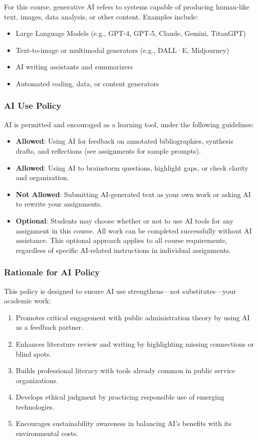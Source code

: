 \documentclass[12pt, letterpaper]{article}
\begin{document}
\noindent For this course, generative AI refers to systems capable of producing human-like text, images, data analysis, or other content. Examples include:

\begin{itemize}
    \item Large Language Models (e.g., GPT-4, GPT-5, Claude, Gemini, TitanGPT)
    \item Text-to-image or multimodal generators (e.g., DALL·E, Midjourney)
    \item AI writing assistants and summarizers
    \item Automated coding, data, or content generators
\end{itemize}

\subsubsection*{AI Use Policy}

AI is permitted and encouraged as a learning tool, under the following guidelines:

\begin{itemize}
    \item \textbf{Allowed}: Using AI for feedback on annotated bibliographies, synthesis drafts, and reflections (see assignments for sample prompts).
    \item \textbf{Allowed}: Using AI to brainstorm questions, highlight gaps, or check clarity and organization.
    \item \textbf{Not Allowed}: Submitting AI-generated text as your own work or asking AI to rewrite your assignments.
    \item \textbf{Optional}: Students may choose whether or not to use AI tools for any assignment in this course. All work can be completed successfully without AI assistance. This optional approach applies to all course requirements, regardless of specific AI-related instructions in individual assignments.
\end{itemize}

\subsubsection*{Rationale for AI Policy}

This policy is designed to ensure AI use strengthens—not substitutes—your academic work:

\begin{enumerate}
    \item Promotes critical engagement with public administration theory by using AI as a feedback partner.
    \item Enhances literature review and writing by highlighting missing connections or blind spots.
    \item Builds professional literacy with tools already common in public service organizations.
    \item Develops ethical judgment by practicing responsible use of emerging technologies.
    \item Encourages sustainability awareness in balancing AI's benefits with its environmental costs.
\end{enumerate}
\end{document}
